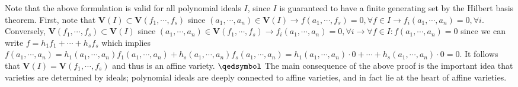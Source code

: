 \documentclass{article}
\begin{document}
\indent Note that the above formulation is valid for all polynomial ideals $ I $, since $ I $ is guaranteed to have a finite generating set by the Hilbert basis theorem.
\newline
\indent First, note that $ \mathbf{V}(I) \subset \mathbf{V}(f_1, \cdots, f_s) $ since $ (a_1, \cdots, a_n) \in \mathbf{V}(I) \rightarrow f(a_1, \cdots, f_s) = 0, \forall f \in I \rightarrow f_i(a_1, \cdots, a_n) = 0, \forall i $. Conversely, $ \mathbf{V}(f_1, \cdots, f_s) \subset \mathbf{V}(I) $ since $ (a_1, \cdots, a_n) \in \mathbf{V}(f_1, \cdots, f_s) \rightarrow f_i(a_1, \cdots, a_n) = 0, \forall i \rightarrow \forall f \in I: f(a_1, \cdots, a_n) = 0 $ since we can write $ f = h_1 f_1 + \cdots + h_s f_s $ which implies $ f(a_1, \cdots, a_n) = h_1(a_1, \cdots, a_n) f_1(a_1, \cdots, a_n) + h_s(a_1, \cdots, a_n) f_s(a_1, \cdots, a_n) = h_1(a_1, \cdots, a_n) \cdot 0 + \cdots + h_s(a_1, \cdots, a_n) \cdot 0 = 0 $.
\newline
\indent It follows that $ \mathbf{V}(I) = \mathbf{V}(f_1, \cdots, f_s) $ and thus is an affine variety. $ \qedsymbol $
\newline \newline
The main consequence of the above proof is the important idea that varieties are determined by ideals; polynomial ideals are deeply connected to affine varieties, and in fact lie at the heart of affine varieties.
\end{document}
